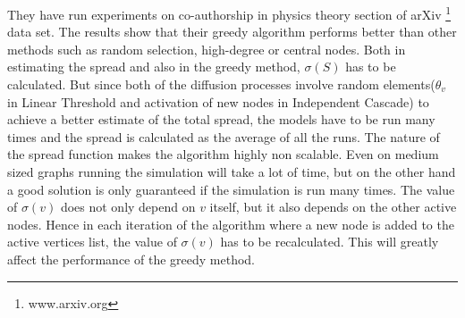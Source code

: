 \documentclass[english]{tktltiki}
\begin{document}
They have run experiments on co-authorship in physics theory section of arXiv \footnote{www.arxiv.org} data set. 
The results show that their greedy algorithm performs better than other methods such as random selection, high-degree or central nodes.
Both in estimating the spread and also in the greedy method, $\sigma(S)$ has to be calculated.
But since both of the diffusion processes involve random elements($\theta_v$ in Linear Threshold and activation of new nodes in Independent Cascade) to achieve a better estimate of the total spread, the models have to be run many times and the spread is calculated as the average of all the runs. 
The nature of the spread function makes the algorithm highly non scalable. 
Even on medium sized graphs running the simulation will take a lot of time, but on the other hand a good solution is only guaranteed if the simulation is run many times. 
The value of $\sigma(v)$ does not only depend on $v$ itself, but it also depends on the other active nodes. 
Hence in each iteration of the algorithm where a new node is added to the active vertices list, the value of $\sigma(v)$ has to be recalculated. This will greatly affect the performance of the greedy method.
\end{document}
